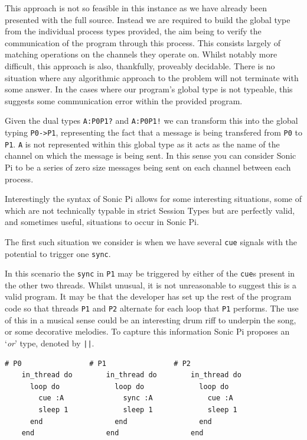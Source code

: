 \documentclass[11pt, abstracton, twoside, titlepage=true]{scrartcl}
\begin{document}
This approach is not so feasible in this instance as we have already been 
presented with the full source. Instead we are required to build the global
type from the individual process types provided, the aim being to verify
the communication of the program through this process. This consists largely of 
matching operations on the channels they operate on. Whilst notably more
difficult, this approach is also, thankfully, proveably decidable. There is
no situation where any algorithmic approach to the problem will not terminate
with some answer. In the cases where our program's global type is not
typeable, this suggests some communication error within the provided program.

Given the dual types \texttt{A:P0P1?} and \texttt{A:P0P1!} we can transform 
this into the global typing \texttt{P0->P1}, representing the fact that a 
message is being transfered from \texttt{P0} to \texttt{P1}. \texttt{A} is not
represented within this global type as it acts as the name of the channel on
which the message is being sent. In this sense you can consider Sonic Pi
to be a series of zero size messages being sent on each channel between
each process.

Interestingly the syntax of Sonic Pi allows for some interesting situations,
some of which are not technically typable in strict Session Types but are
perfectly valid, and sometimes useful, situations to occur in Sonic Pi.

The first such situation we consider is when we have several \texttt{cue}
signals with the potential to trigger one \texttt{sync}.

In this scenario the \texttt{sync} in \texttt{P1} may be triggered by either
of the \texttt{cue}s present in the other two threads. Whilst unusual,
it is not unreasonable to suggest this is a valid program. It may be that the
developer has set up the rest of the program code so that threads \texttt{P1} 
and \texttt{P2} alternate for each loop that \texttt{P1} performs. The use
of this in a musical sense could be an interesting drum riff to underpin the
song, or some decorative melodies. To capture this information Sonic Pi 
proposes an `\emph{or}' type, denoted by \texttt{||}. 


\begin{minipage}{\textwidth}
	\begin{lstlisting}[style = sonicpi]
    # P0                # P1                # P2
    in_thread do        in_thread do        in_thread do
      loop do             loop do             loop do
        cue :A              sync :A             cue :A
        sleep 1             sleep 1             sleep 1
      end                 end                 end
    end                 end                 end
	\end{lstlisting}
\end{minipage}
\end{document}
